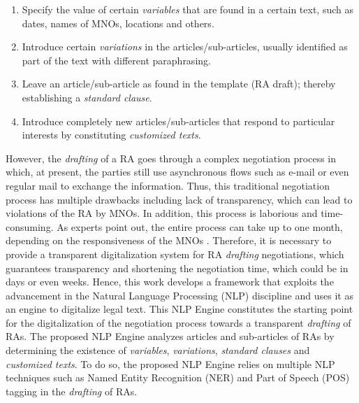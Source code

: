\begin{enumerate}
\item Specify the value of certain \textit{variables} that are found in a certain text, such as dates, names of MNOs, locations and others.
\item Introduce certain \textit{variations} in the articles/sub-articles, usually identified as part of the text with different paraphrasing.
\item Leave an article/sub-article as found in the template (RA draft); thereby establishing a \textit{standard clause}.
\item Introduce completely new articles/sub-articles that respond to particular interests by constituting \textit{customized texts}.
\end{enumerate}

However, the \textit{drafting} of a RA goes through a complex negotiation process in which, at present, the parties still use asynchronous flows such as e-mail or even regular mail to exchange the information. Thus, this traditional negotiation process has multiple drawbacks including lack of transparency, which can lead to violations of the RA by MNOs. In addition, this process is laborious and time-consuming. As experts point out, the entire process can take up to one month, depending on the responsiveness of the MNOs \cite{ROCCO2017a}. Therefore, it is necessary to provide a transparent digitalization system for RA \textit{drafting} negotiations, which guarantees transparency and shortening the negotiation time, which could be in days or even weeks. Hence, this work develops a framework that exploits the advancement in the Natural Language Processing (NLP) discipline and uses it as an engine to digitalize legal text. This NLP Engine constitutes the starting point for the digitalization of the negotiation process towards a transparent \textit{drafting} of RAs. The proposed NLP Engine analyzes articles and sub-articles of RAs by determining the existence of \textit{variables}, \textit{variations}, \textit{standard clauses} and \textit{customized texts}. To do so, the proposed NLP Engine relies on multiple NLP techniques such as Named Entity Recognition (NER) and Part of Speech (POS) tagging in the \textit{drafting} of RAs.




